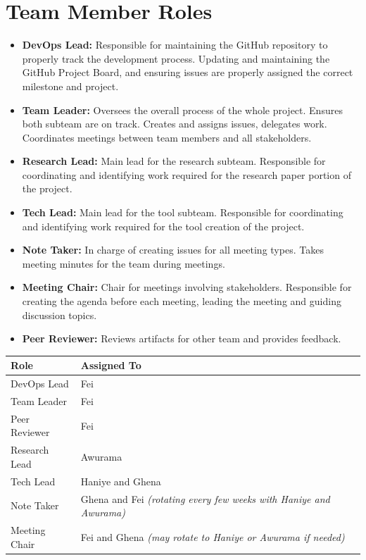 \documentclass{article}
\begin{document}
\section{Team Member Roles}
\begin{itemize}
  \item \textbf{DevOps Lead:} Responsible for maintaining the GitHub repository to properly track the development process. Updating and maintaining the GitHub Project Board, and ensuring issues are properly assigned the correct milestone and project.
  \item \textbf{Team Leader:} Oversees the overall process of the whole project. Ensures both subteam are on track. Creates and assigns issues, delegates work. Coordinates meetings between team members and all stakeholders.
  \item \textbf{Research Lead:} Main lead for the research subteam. Responsible for coordinating and identifying work required for the research paper portion of the project.
  \item \textbf{Tech Lead:} Main lead for the tool subteam. Responsible for coordinating and identifying work required for the tool creation of the project.
  \item \textbf{Note Taker:} In charge of creating issues for all meeting types. Takes meeting minutes for the team during meetings.
  \item \textbf{Meeting Chair:} Chair for meetings involving stakeholders. Responsible for creating the agenda before each meeting, leading the meeting and guiding discussion topics.
  \item \textbf{Peer Reviewer:} Reviews artifacts for other team and provides feedback.
\end{itemize}
\begin{center}
\begin{tabular}{|l|l|}
\hline
\textbf{Role} & \textbf{Assigned To} \\
\hline
DevOps Lead & Fei \\
Team Leader & Fei \\
Peer Reviewer & Fei \\
Research Lead & Awurama \\
Tech Lead & Haniye and Ghena \\
Note Taker & Ghena and Fei \textit{(rotating every few weeks with Haniye and Awurama)} \\
Meeting Chair & Fei and Ghena \textit{(may rotate to Haniye or Awurama if needed)} \\
\hline
\end{tabular}
\end{center}
\end{document}
